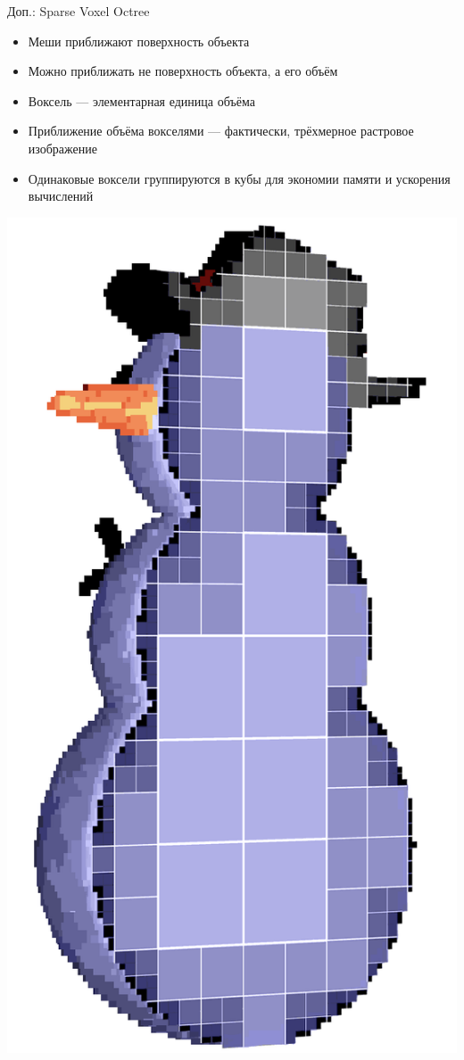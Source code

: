 \begin{frame}{Доп.: Sparse Voxel Octree}
    \centering
    \begin{minipage}{.75\textwidth}
        \begin{itemize}
            \item Меши приближают поверхность объекта
            \item Можно приближать не поверхность объекта, а его объём
            \item Воксель --- элементарная единица объёма
            \item Приближение объёма вокселями --- фактически, трёхмерное растровое изображение
            \item Одинаковые воксели группируются в кубы для экономии памяти и ускорения вычислений
        \end{itemize}
    \end{minipage}
    \begin{minipage}{.2\textwidth}
        \includegraphics[width=\textwidth]{../Text/pics/SVO-voxel-snowman-slice-01.png}

\end{minipage}
\end{frame}
